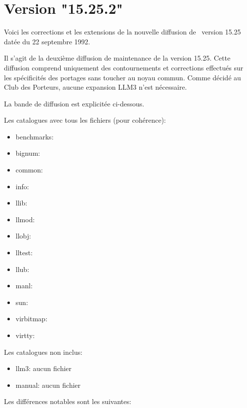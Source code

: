 

\Begin
{}


                 
                            
\chapter {Version "15.25.2"}
Voici les corrections et les extensions de la nouvelle diffusion de
\LeLisp\ version 15.25 dat\'{e}e du 22 septembre 1992.

Il s'agit de la deuxi\`{e}me diffusion de maintenance de la version
15.25.  Cette diffusion comprend uniquement des 
contournements et corrections effectu\'{e}s sur les sp\'{e}cificit\'{e}s des
portages sans toucher au noyau commun.
Comme d\'{e}cid\'{e} au Club des Porteurs, aucune expansion LLM3 n'est n\'{e}cessaire.


La bande de diffusion est explicit\'{e}e ci-dessous.

Les catalogues avec tous les fichiers (pour coh\'{e}rence):

\begin {itemize}
\item   benchmarks:
\item   bignum:
\item   common: 
\item   info:
\item   llib:           
\item   llmod:
\item   llobj:
\item   lltest:         
\item   llub:   
\item   manl:
\item   sun:
\item   virbitmap:
\item   virtty: 
\end {itemize}

Les catalogues non inclus:

\begin {itemize}
\item   llm3:   aucun fichier
\item   manual: aucun fichier
\end {itemize}


Les diff\'{e}rences notables sont les suivantes:


